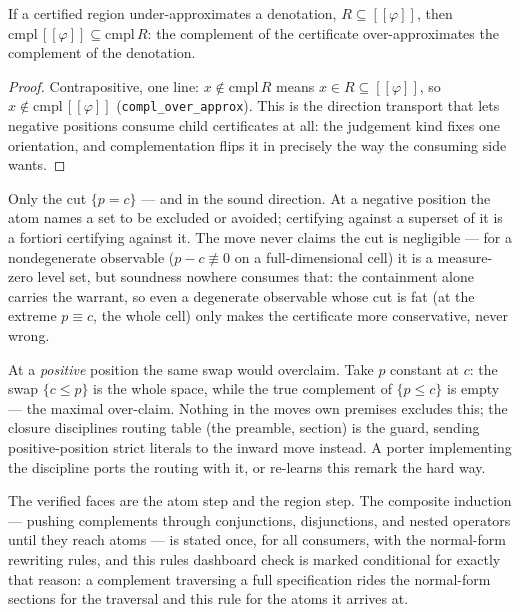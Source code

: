 \begin{bprop}\label{prop:co-region}
If a certified region under-approximates a denotation,
$R \subseteq [\![\varphi]\!]$, then
$\mathrm{cmpl}\,[\![\varphi]\!] \subseteq \mathrm{cmpl}\,R$: the
complement of the certificate over-approximates the complement of the
denotation.
\end{bprop}
\begin{proof}
Contrapositive, one line: $x \notin \mathrm{cmpl}\,R$ means
$x \in R \subseteq [\![\varphi]\!]$, so
$x \notin \mathrm{cmpl}\,[\![\varphi]\!]$
(\texttt{compl\_over\_approx}). This is the direction transport that
lets negative positions consume child certificates at all: the
judgement kind fixes one orientation, and complementation flips it in
precisely the way the consuming side wants.
\end{proof}

\begin{bremark}
Only the cut $\{p = c\}$ --- and in the sound direction. At a
negative position the atom names a set to be excluded or avoided;
certifying against a superset of it is a fortiori certifying against
it. The move never claims the cut is negligible --- for a nondegenerate
observable ($p - c \not\equiv 0$ on a full-dimensional cell) it is a
measure-zero level set, but soundness nowhere consumes that: the
containment alone carries the warrant, so even a degenerate observable
whose cut is fat (at the extreme $p \equiv c$, the whole cell) only
makes the certificate more conservative, never wrong.
\end{bremark}

\begin{bremark}
At a \emph{positive} position the same swap would overclaim. Take $p$
constant at $c$: the swap $\{c \le p\}$ is the whole space, while the
true complement of $\{p \le c\}$ is empty --- the maximal over-claim.
Nothing in the move\textquotesingle s own premises excludes this; the
closure discipline\textquotesingle s routing table
(the preamble,  section) is the
guard, sending positive-position strict literals to the inward move
instead. A porter implementing the discipline ports the routing with
it, or re-learns this remark the hard way.
\end{bremark}

\begin{bremark}
The verified faces are the atom step and the region step. The
composite induction --- pushing complements through conjunctions,
disjunctions, and nested operators until they reach atoms --- is
stated once, for all consumers, with the normal-form rewriting rules,
and this rule\textquotesingle s dashboard check is marked conditional
for exactly that reason: a complement traversing a full specification
rides the normal-form sections for the traversal and this rule for
the atoms it arrives at.
\end{bremark}

